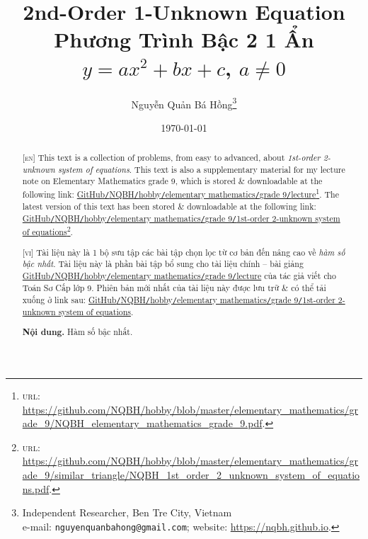 \documentclass{article}
\title{2nd-Order 1-Unknown Equation\\Phương Trình Bậc 2 1 Ẩn $y = ax^2 + bx + c$, $a\ne0$}
\author{Nguyễn Quản Bá Hồng\footnote{Independent Researcher, Ben Tre City, Vietnam\\e-mail: \texttt{nguyenquanbahong@gmail.com}; website: \url{https://nqbh.github.io}.}}
\date{\today}
\begin{document}
\maketitle
\begin{abstract}
	\textsc{[en]} This text is a collection of problems, from easy to advanced, about \textit{1st-order 2-unknown system of equations}. This text is also a supplementary material for my lecture note on Elementary Mathematics grade 9, which is stored \& downloadable at the following link: \href{https://github.com/NQBH/hobby/blob/master/elementary_mathematics/grade_9/NQBH_elementary_mathematics_grade_9.pdf}{GitHub\texttt{/}NQBH\texttt{/}hobby\texttt{/}elementary mathematics\texttt{/}grade 9\texttt{/}lecture}\footnote{\textsc{url}: \url{https://github.com/NQBH/hobby/blob/master/elementary_mathematics/grade_9/NQBH_elementary_mathematics_grade_9.pdf}.}. The latest version of this text has been stored \& downloadable at the following link: \href{https://github.com/NQBH/hobby/blob/master/elementary_mathematics/grade_9/1st_order_2_unknown_system_of_equations/NQBH_1st_order_2_unknown_system_of_equations.pdf}{GitHub\texttt{/}NQBH\texttt{/}hobby\texttt{/}elementary mathematics\texttt{/}grade 9\texttt{/}1st-order 2-unknown system of equations}\footnote{\textsc{url}: \url{https://github.com/NQBH/hobby/blob/master/elementary_mathematics/grade_9/similar_triangle/NQBH_1st_order_2_unknown_system_of_equations.pdf}.}.
	\vspace{2mm}
	
	\textsc{[vi]} Tài liệu này là 1 bộ sưu tập các bài tập chọn lọc từ cơ bản đến nâng cao về \textit{hàm số bậc nhất}. Tài liệu này là phần bài tập bổ sung cho tài liệu chính -- bài giảng \href{https://github.com/NQBH/hobby/blob/master/elementary_mathematics/grade_9/NQBH_elementary_mathematics_grade_9.pdf}{GitHub\texttt{/}NQBH\texttt{/}hobby\texttt{/}elementary mathematics\texttt{/}grade 9\texttt{/}lecture} của tác giả viết cho Toán Sơ Cấp lớp 9. Phiên bản mới nhất của tài liệu này được lưu trữ \& có thể tải xuống ở link sau: \href{https://github.com/NQBH/hobby/blob/master/elementary_mathematics/grade_9/1st_order_2_unknown_system_of_equations/NQBH_1st_order_2_unknown_system_of_equations.pdf}{GitHub\texttt{/}NQBH\texttt{/}hobby\texttt{/}elementary mathematics\texttt{/}grade 9\texttt{/}1st-order 2-unknown system of equations}.
	
	\textsf{\textbf{Nội dung.} Hàm số bậc nhất.}
\end{abstract}
\tableofcontents
\newpage

\end{document}
